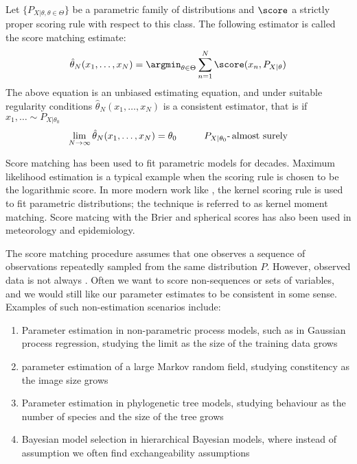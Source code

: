 \begin{definition}
Let $\{P_{X\vert\theta, \theta\in\Theta}\}$ be a parametric family of distributions and $\score$ a strictly proper scoring rule with respect to this class. The following estimator is called the score matching estimate:
\begin{equation}
	\hat{\theta}_N(x_1,\ldots,x_N) = \argmin_{\theta\in\Theta} \sum_{n=1}^{N}\score(x_n,P_{X\vert\theta}) \label{Eqn:score_matching}
\end{equation}
The above equation is an unbiased estimating equation, and under suitable regularity conditions $\hat{\theta}_N(x_1,\ldots,x_N)$ is a consistent estimator, that is if $x_1,\ldots\sim P_{X\vert\theta_0}$\iid
\begin{equation}
	\lim_{N \rightarrow \infty} \hat{\theta}_N(x_1,\ldots,x_N) = \theta_0\hspace{1cm} P_{X\vert\theta_0}\mbox{-\,almost surely}
\end{equation}
\end{definition}

Score matching has been used to fit parametric models for decades. Maximum likelihood estimation is a typical example when the scoring rule is chosen to be the logarithmic score. In more modern work like \citep{kernelmomentmatching}, the kernel scoring rule is used to fit parametric distributions; the technique is referred to as kernel moment matching. Score matcing with the Brier and spherical scores has also been used in meteorology and epidemiology.

The score matching procedure assumes that one observes a sequence of \iid observations repeatedly sampled from the same distribution $P$. However, observed data is not always \iid. Often we want to score non-\iid sequences or sets of variables, and we would still like our parameter estimates to be consistent in some sense. Examples of such non-\iid estimation scenarios include:
\begin{enumerate}
	\item Parameter estimation in non-parametric process models, such as in Gaussian process regression, studying the limit as the size of the training data grows
	\item parameter estimation of a large Markov random field, studying constitency as the image size grows
	\item Parameter estimation in phylogenetic tree models, studying behaviour as the number of species and the size of the tree grows
	\item Bayesian model selection in hierarchical Bayesian models, where instead of \iid assumption we often find exchangeability assumptions
\end{enumerate}

